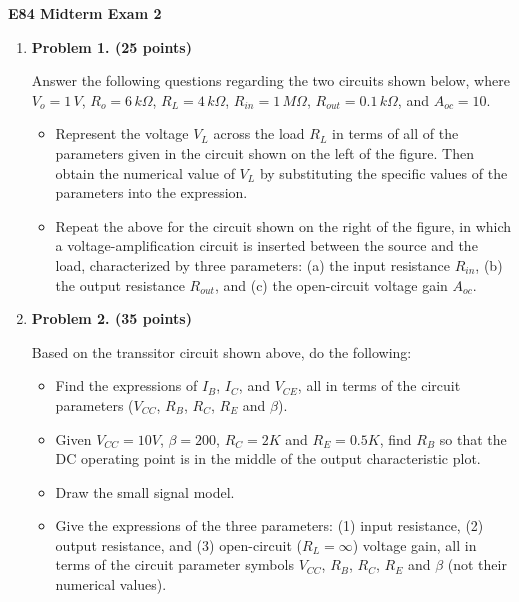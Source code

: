 \usepackage{html}

\begin{center}
{\Large \bf E84 Midterm Exam 2}
\end{center}


\begin{enumerate}

\item {\bf Problem 1. (25 points)} 

  Answer the following questions regarding the two circuits shown 
  below, where $V_o=1\,V$, $R_o=6\,k\Omega$, $R_L=4\,k\Omega$, 
  $R_{in}=1\,M\Omega$, $R_{out}=0.1\,k\Omega$, and $A_{oc}=10$.
  \begin{itemize}
  \item Represent the voltage $V_L$ across the load $R_L$ in terms of 
    all of the parameters given in the circuit shown on the left of the 
    figure. Then obtain the numerical value of $V_L$ by substituting the 
    specific values of the parameters into the expression.
  \item Repeat the above for the circuit shown on the right of the 
    figure, in which a voltage-amplification circuit is inserted between 
    the source and the load, characterized by three parameters: (a) the
    input resistance $R_{in}$, (b) the output resistance $R_{out}$, and 
    (c) the open-circuit voltage gain $A_{oc}$. 
  \end{itemize}



\item {\bf Problem 2. (35 points)}


Based on the transsitor circuit shown above, do the following:
\begin{itemize}
\item Find the expressions of $I_B$, $I_C$, and $V_{CE}$, all in terms 
  of the circuit parameters ($V_{CC}$, $R_B$, $R_C$, $R_E$ and $\beta$).
\item Given $V_{CC}=10V$, $\beta=200$, $R_C=2K$ and $R_E=0.5K$, find
  $R_B$ so that the DC operating point is in the middle of the output
  characteristic plot.
\item Draw the small signal model.
\item Give the expressions of the three parameters: (1) input resistance,
  (2) output resistance, and (3) open-circuit ($R_L=\infty$) voltage gain,
  all in terms of the circuit parameter symbols $V_{CC}$, $R_B$, $R_C$, 
  $R_E$ and $\beta$ (not their numerical values).
\end{itemize}


\end{enumerate}
